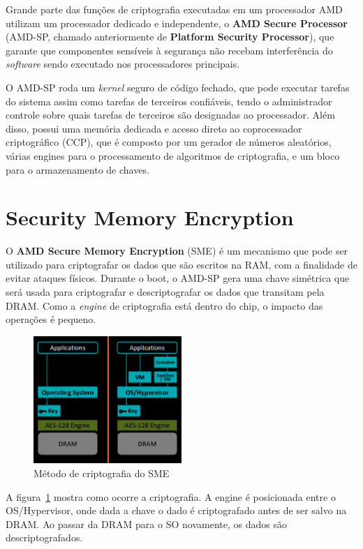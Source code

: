 \documentclass{report}
\begin{document}
Grande parte das funções de criptografia executadas em um processador AMD
utilizam um processador dedicado e independente, o \textbf{AMD Secure
Processor} (AMD-SP, chamado anteriormente de \textbf{Platform Security
Processor}), que garante que componentes sensíveis à segurança não recebam
interferência do \textit{software} sendo executado nos processadores
principais.

O AMD-SP roda um \textit{kernel} seguro de código fechado, que pode executar
tarefas do sistema assim como tarefas de terceiros confiáveis, tendo o
administrador controle sobre quais tarefas de terceiros são designadas ao
processador. Além disso, possui uma memória dedicada e acesso direto ao
coprocessador criptográfico (CCP), que é composto por um gerador de números
aleatórios, várias engines para o processamento de algoritmos de criptografia,
e um bloco para o armazenamento de chaves.

\section{Security Memory Encryption}
O \textbf{AMD Secure Memory Encryption} (SME) é um mecanismo que pode ser
utilizado para criptografar os dados que são escritos na RAM, com a finalidade
de evitar ataques físicos. Durante o boot, o AMD-SP gera uma chave simétrica
que será usada para criptografar e descriptografar os dados que transitam pela
DRAM\@. Como a \textit{engine} de criptografia está dentro do chip, o impacto
das operações é pequeno.

\begin{figure}[h]
    \centering
    \includegraphics[width=0.5\textwidth]{img/sme}
    \caption{Método de criptografia do SME}\label{sme-1}
\end{figure}

A figura~\ref{sme-1} mostra como ocorre a criptografia. A engine é posicionada
entre o OS/Hypervisor, onde dada a chave o dado é criptografado antes de ser
salvo na DRAM\@. Ao passar da DRAM para o SO novamente, os dados são
descriptografados.
\end{document}
